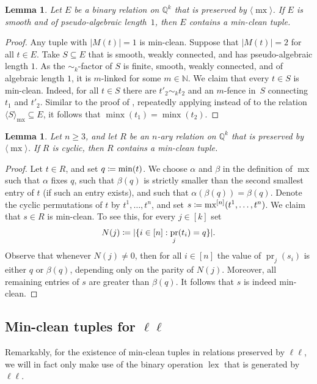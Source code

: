 \documentclass[a4paper,reqno, cleveref]{amsart}
\newcommand{\coloneqq}{\mathrel{\mathop:}\mathrel{\mkern-1.2mu}=}
\newtheorem{lemma}[theorem]{Lemma}
\newcommand{\N}{\mathbb{N}}
\newcommand{\Q}{\mathbb{Q}}
\newcommand{\br}[1]{[#1]}
\DeclareMathOperator{\pr}{pr}
\DeclareMathOperator{\mx}{mx}
\DeclareMathOperator{\lex}{lex}
\DeclareMathOperator{\minx}{minx}
\newcommand{\bin}{E}
\newcommand{\nested}[2]{{#1^{[#2]}}}
\newcommand{\gen}[1]{\langle#1\rangle}
\newcommand{\genrel}[2]{\langle{#1}\rangle_{#2}}
\begin{document}
\begin{lemma}\label{lemma:mx:minclean}
     Let $\bin$ be a binary relation on $\Q^k$ that is  preserved by $\gen{\mx}$. If $\bin$ is smooth and of pseudo-algebraic length~$1$,      then $\bin$ contains a min-clean tuple.
\end{lemma}
\begin{proof}
Any tuple with $|M(t)|=1$ is min-clean. Suppose that $|M(t)|=2$ for all $t \in \bin$. Take $S\subseteq E$ that is smooth, weakly connected, and has  pseudo-algebraic length $1$. As the $\sim_{k}$-factor of $S$ is finite, smooth, weakly connected, and of algebraic length $1$, it is $m$-linked for some $m\in \N$. We claim that every $t \in S $ is min-clean. Indeed, for all $t \in S $ there are $t'_2\sim_k t_2$ and an $m$-fence  in~$S $ connecting $t_1$ and $t'_2$. Similar to the proof of , repeatedly applying  instead of  to the relation $\genrel{S}{\mx}\subseteq E$, it  follows that $\minx(t_1)=\minx(t_2)$. 

\end{proof}

\begin{lemma}\label{l:hypmx:minclean}
Let $n\geq 3$, and let $R$ be an $n$-ary  relation on $\Q^k$ that is  preserved by $\gen\mx$. If $R$ is  cyclic, then $R$ contains a min-clean tuple. 
\end{lemma}

\begin{proof}
  Let $t \in R$, and %
  set $q\coloneqq\min(t)$. We choose $\alpha$ and $\beta$ in the definition of $\mx$ such that $\alpha$ fixes $q$, such that   $\beta(q)$ is strictly smaller than the second smallest entry of $t$ (if such an entry exists), and  such that $\alpha(\beta(q))=\beta(q)$. 
  Denote the cyclic permutations of $t$ by $t^{1},\dots,t^{n}$, and set $s\coloneqq \nested{\mx}{n}(t^{1},\dots,t^{n})$. We claim that $s\in R$ is min-clean. 
   To see this, for every $j \in \br k$ set 
   \[N(j)\coloneqq |\{i \in \br n:\pr_j(t_i)=q\}|.\]
   Observe that whenever $N(j)\neq 0$,  then for all $i \in\br n$ the value of  $\pr_j(s_i)$ is either $q$ or $\beta(q)$, depending only on the parity of $N(j)$. Moreover, all remaining entries of $s$ are greater than $\beta(q)$. It follows that $s$ is indeed min-clean.  
\end{proof}

    
    
\subsection{Min-clean tuples for \texorpdfstring{$\ell\ell$}{ll}}
Remarkably, for the existence of min-clean tuples in relations preserved by $\ell \ell$, we will in fact only make use of the binary operation $\lex$ that is generated by $\ell \ell$.
\end{document}
